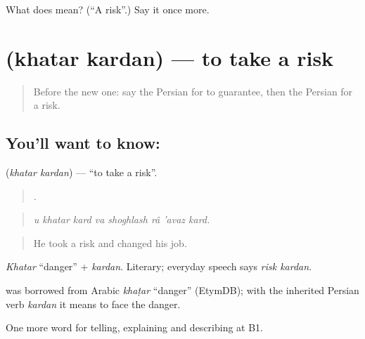 \begin{tcolorbox}[breakable,colback=teal!4,colframe=teal!35!black,title={Before you move on}]
What does  mean? (\textquotedblleft{}A risk\textquotedblright{}.) Say it once more.
\end{tcolorbox}
\section[\texorpdfstring{\fa{خطر} \fa{کردن} (khatar kardan)}{خطر کردن (khatar kardan)}]{  (khatar kardan) — to take a risk}

\label{lesson:FA-C394-khatar-kardan}



\begin{quote}
Before the new one: say the Persian for to guarantee, then the Persian for a risk.
\end{quote}

\subsection*{You'll want to know:  }
\textbf{ } (\emph{khatar kardan}) — \textquotedblleft{}to take a risk\textquotedblright{}.

\begin{quote}
       .
\end{quote}

\begin{quote}
\emph{u khatar kard va shoghlash râ 'avaz kard.}
\end{quote}

\begin{quote}
He took a risk and changed his job.
\end{quote}

\emph{Khatar} \textquotedblleft{}danger\textquotedblright{} + \emph{kardan}. Literary; everyday speech says \emph{risk kardan}.

\begin{cousinweb}
\textbf{} was borrowed from Arabic \emph{khaṭar} \textquotedblleft{}danger\textquotedblright{} (EtymDB); with the inherited Persian verb \emph{kardan} it means to face the danger.
\end{cousinweb}

\begin{grammarlens}[title={What you've built}]
One more word for telling, explaining and describing at B1.
\end{grammarlens}


